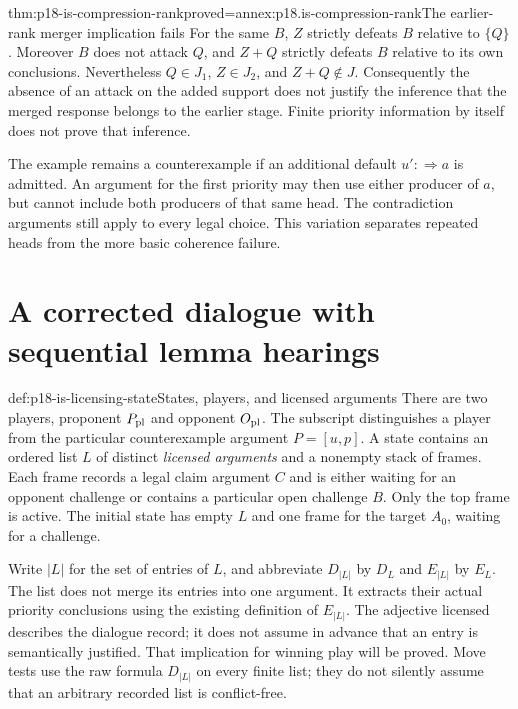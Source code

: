 \begin{hbtheorem}{thm:p18-is-compression-rank}{proved=annex:p18.is-compression-rank}{The earlier-rank merger implication fails}
For the same \(B\), \(Z\) strictly defeats \(B\) relative to
\(\{Q\}\). Moreover \(B\) does not attack \(Q\), and
\(Z+Q\) strictly defeats \(B\) relative to its own conclusions.
Nevertheless \(Q\in J_1\), \(Z\in J_2\), and \(Z+Q\notin J\).
Consequently the absence of an attack on the added support does
not justify the inference that the merged response belongs to
the earlier stage. Finite priority information by itself does
not prove that inference.
\end{hbtheorem}

The example remains a counterexample if an additional default
\(u':\Rightarrow a\) is admitted. An argument for the first priority
may then use either producer of \(a\), but cannot include both
producers of that same head. The contradiction arguments still
apply to every legal choice. This variation separates repeated
heads from the more basic coherence failure.

\section{A corrected dialogue with sequential lemma hearings}

\begin{hbdefinition}{def:p18-is-licensing-state}{States, players, and licensed arguments}
There are two players, proponent \(P_{\rm pl}\) and opponent
\(O_{\rm pl}\). The subscript distinguishes a player from the
particular counterexample argument \(P=[u,p]\).
A state contains an ordered list \(L\) of distinct
\emph{licensed arguments} and a nonempty stack of frames.
Each frame records a legal claim argument \(C\) and is either
waiting for an opponent challenge or contains a particular open
challenge \(B\). Only the top frame is active.
The initial state has empty \(L\) and one frame for the target \(A_0\),
waiting for a challenge.

Write \(|L|\) for the set of entries of \(L\), and abbreviate
\(D_{|L|}\) by \(D_L\) and \(E_{|L|}\) by \(E_L\).
The list does not merge its entries into
one argument. It extracts their actual priority conclusions using
the existing definition of \(E_{|L|}\).
The adjective licensed describes the dialogue record; it does
not assume in advance that an entry is semantically justified.
That implication for winning play will be proved.
Move tests use the raw formula \(D_{|L|}\) on every finite list;
they do not silently assume that an arbitrary recorded list
is conflict-free.
\end{hbdefinition}

